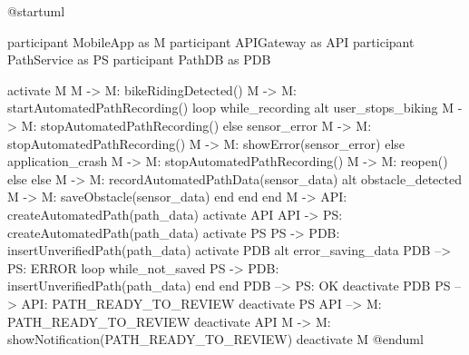 @startuml

participant MobileApp as M
participant APIGateway as API 
participant PathService as PS
participant PathDB as PDB

activate M
M -> M: bikeRidingDetected()
M -> M: startAutomatedPathRecording()
loop while_recording
alt user_stops_biking
M -> M: stopAutomatedPathRecording()
else sensor_error
M -> M: stopAutomatedPathRecording()
M -> M: showError(sensor_error)
else application_crash
M -> M: stopAutomatedPathRecording()
M -> M: reopen()
else else
M -> M: recordAutomatedPathData(sensor_data)
alt obstacle_detected
M -> M: saveObstacle(sensor_data)
end
end
end
M -> API: createAutomatedPath(path_data)
activate API
API -> PS: createAutomatedPath(path_data)
activate PS
PS -> PDB: insertUnverifiedPath(path_data)
activate PDB
alt error_saving_data
PDB --> PS: ERROR
loop while_not_saved
PS -> PDB: insertUnverifiedPath(path_data)
end
end
PDB --> PS: OK
deactivate PDB
PS --> API: PATH_READY_TO_REVIEW
deactivate PS
API --> M: PATH_READY_TO_REVIEW
deactivate API
M -> M: showNotification(PATH_READY_TO_REVIEW)
deactivate M
@enduml